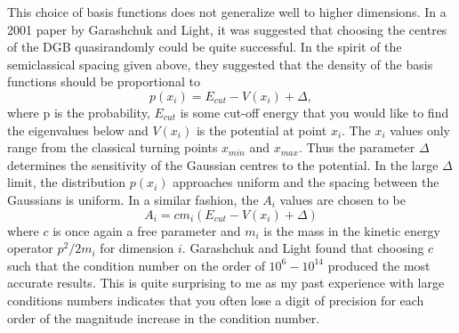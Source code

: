 This choice of basis functions does not generalize well to higher dimensions.  In a 2001 paper by Garashchuk and Light\cite{Garashchuk2001}, it was suggested that choosing the centres of the DGB quasirandomly could be quite successful.  In the spirit of the semiclassical spacing given above, they suggested that the density of the basis functions should be proportional to 
\begin{equation}\label{eq.pprob}
p\left(x_i\right)=E_{cut}-V\left(x_i\right)+\Delta,
\end{equation}   
where p is the probability, $E_{cut}$ is some cut-off energy that you would like to find the eigenvalues below and $V\left(x_i\right)$ is the potential at point $x_i$. The $x_i$ values only range from the classical turning points $x_{min}$ and $x_{max}$.  Thus the parameter $\Delta$ determines the sensitivity of the Gaussian centres to the potential.  In the large $\Delta$ limit, the distribution $p\left(x_i\right)$ approaches uniform and the spacing between the Gaussians is uniform.  In a similar fashion, the $A_i$ values are chosen to be
\begin{equation}
A_i=c m_i\left(E_{cut} -V\left(x_i\right)+\Delta\right)
\end{equation}
where $c$ is once again a free parameter and $m_i$ is the mass in the kinetic energy operator $p^2/2m_i$ for dimension $i$.  Garashchuk and Light found that choosing $c$ such that the condition number on the order of $10^6-10^{14}$ produced the most accurate results.  This is quite surprising to me as my past experience with large conditions numbers\cite{vanDijk2011} indicates that you often lose a digit of precision for each order of the magnitude increase in the condition number.
 

